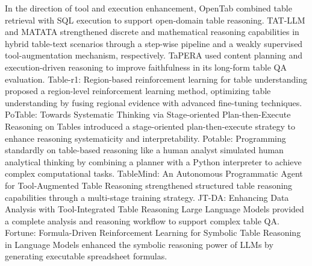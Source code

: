 In the direction of tool and execution enhancement, OpenTab \cite{kong2024opentab} combined table retrieval with SQL execution to support open-domain table reasoning. TAT-LLM \cite{zhu2024tat} and MATATA \cite{vinayagame2025matata} strengthened discrete and mathematical reasoning capabilities in hybrid table-text scenarios through a step-wise pipeline and a weakly supervised tool-augmentation mechanism, respectively. TaPERA \cite{zhao2024tapera} used content planning and execution-driven reasoning to improve faithfulness in its long-form table QA evaluation. Table-r1: Region-based reinforcement learning for table understanding \cite{tabler12025} proposed a region-level reinforcement learning method, optimizing table understanding by fusing regional evidence with advanced fine-tuning techniques. PoTable: Towards Systematic Thinking via Stage-oriented Plan-then-Execute Reasoning on Tables \cite{potable2024} introduced a stage-oriented plan-then-execute strategy to enhance reasoning systematicity and interpretability. Potable: Programming standardly on table-based reasoning like a human analyst \cite{potable2025} simulated human analytical thinking by combining a planner with a Python interpreter to achieve complex computational tasks. TableMind: An Autonomous Programmatic Agent for Tool-Augmented Table Reasoning \cite{tablemind2025} strengthened structured table reasoning capabilities through a multi-stage training strategy. JT-DA: Enhancing Data Analysis with Tool-Integrated Table Reasoning Large Language Models \cite{jt-da2025} provided a complete analysis and reasoning workflow to support complex table QA. Fortune: Formula-Driven Reinforcement Learning for Symbolic Table Reasoning in Language Models \cite{fortune2025} enhanced the symbolic reasoning power of LLMs by generating executable spreadsheet formulas.

